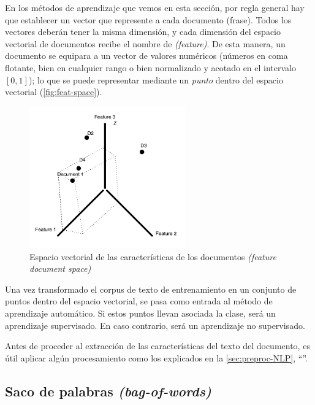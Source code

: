 En los métodos de aprendizaje que vemos en esta sección, por regla general hay que establecer un vector que represente a cada documento (frase). Todos los vectores deberán tener la misma dimensión, y cada dimensión del espacio vectorial de documentos recibe el nombre de  \emph{(feature)}. De esta manera, un documento se equipara a un vector de valores numéricos (números en coma flotante, bien en cualquier rango o bien normalizado y acotado en el intervalo $[0,1]$); lo que se puede representar mediante un \emph{punto} dentro del espacio vectorial (\autoref{fig:feat-space}).

\begin{figure}[htbp]
\centering
{}
\includegraphics[width=0.6\textwidth]{feat-space}
\caption{Espacio vectorial de las características de los documentos \emph{(feature document space)}}
\label{fig:feat-space}
\end{figure}

Una vez transformado el corpus de texto de entrenamiento en un conjunto de puntos dentro del espacio vectorial, se pasa como entrada al método de aprendizaje automático. Si estos puntos llevan asociada la clase, será un aprendizaje supervisado. En caso contrario, será un aprendizaje no supervisado.

Antes de proceder al extracción de las características del texto del documento, es útil aplicar algún procesamiento como los explicados en la \autoref{sec:preproc-NLP}, ``''.

\subsection{Saco de palabras \emph{(bag-of-words)}}

